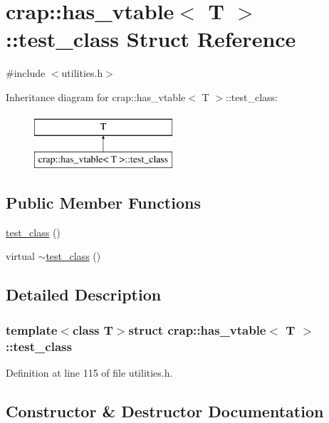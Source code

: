 \hypertarget{structcrap_1_1has__vtable_1_1test__class}{}\section{crap\+:\+:has\+\_\+vtable$<$ T $>$\+:\+:test\+\_\+class Struct Reference}
\label{structcrap_1_1has__vtable_1_1test__class}


{\ttfamily \#include $<$utilities.\+h$>$}

Inheritance diagram for crap\+:\+:has\+\_\+vtable$<$ T $>$\+:\+:test\+\_\+class\+:\begin{figure}[H]
\begin{center}
\leavevmode
\includegraphics[height=2.000000cm]{structcrap_1_1has__vtable_1_1test__class}
\end{center}
\end{figure}
\subsection*{Public Member Functions}
\begin{DoxyCompactItemize}
\item 
\hyperlink{structcrap_1_1has__vtable_1_1test__class_a6e4ee5125a96ae1e7d9ca1c64c4cd8fe}{test\+\_\+class} ()
\item 
virtual \hyperlink{structcrap_1_1has__vtable_1_1test__class_ac1ec56b0a5223d91214a50cba6acd28f}{$\sim$test\+\_\+class} ()
\end{DoxyCompactItemize}


\subsection{Detailed Description}
\subsubsection*{template$<$class T$>$struct crap\+::has\+\_\+vtable$<$ T $>$\+::test\+\_\+class}



Definition at line 115 of file utilities.\+h.



\subsection{Constructor \& Destructor Documentation}
\hypertarget{structcrap_1_1has__vtable_1_1test__class_a6e4ee5125a96ae1e7d9ca1c64c4cd8fe}{}
